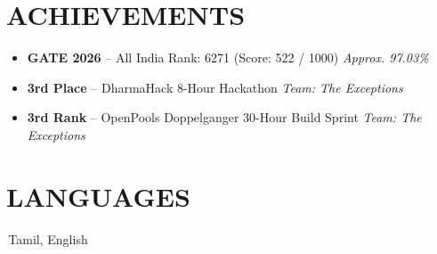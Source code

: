 \documentclass[10pt, a4paper]{article}
\newcommand{\icontext}[2]{\textcolor{iconcolor}{#1}\,{#2}}
\begin{document}
\section{ACHIEVEMENTS}

\begin{itemize}
  \item[\textcolor{iconcolor}{\faTrophy}] \textbf{GATE 2026} -- All India Rank: 6271 (Score: 522 / 1000) \hfill \textit{Approx. 97.03\%}
  \item[\textcolor{iconcolor}{\faTrophy}] \textbf{3rd Place} -- DharmaHack 8-Hour Hackathon \hfill \textit{Team: The Exceptions}
  \item[\textcolor{iconcolor}{\faTrophy}] \textbf{3rd Rank} -- OpenPools Doppelganger 30-Hour Build Sprint \hfill \textit{Team: The Exceptions}
\end{itemize}

\section{LANGUAGES}

\icontext{\faLanguage}{Tamil, English}
\end{document}
